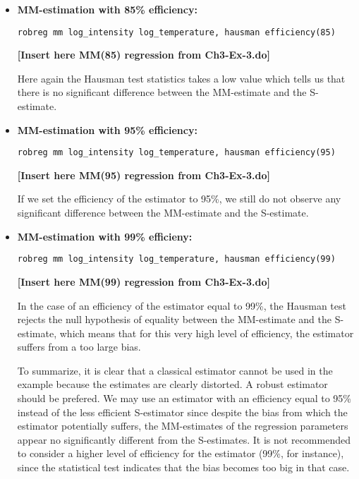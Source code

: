 \begin{stexample}
\begin{itemize}
\item \textbf{MM-estimation with 85\% efficiency:}%

\texttt{robreg mm log\_intensity log\_temperature, hausman efficiency(85)}%


\textbf{[Insert here MM(85) regression from Ch3-Ex-3.do]} 

Here again the Hausman test statistics takes a low value which tells us that
there is no significant difference between the MM-estimate and the S-estimate.

\item \textbf{MM-estimation with 95\% efficiency:}%

\texttt{robreg mm log\_intensity log\_temperature, hausman efficiency(95)}%


\textbf{[Insert here MM(95) regression from Ch3-Ex-3.do]} 

If we set the efficiency of the  estimator to 95\%, we still do not observe
any significant difference between the MM-estimate and the S-estimate.

\item \textbf{MM-estimation with 99\% efficieny:}%

\texttt{robreg mm log\_intensity log\_temperature, hausman efficiency(99)}%


\textbf{[Insert here MM(99) regression from Ch3-Ex-3.do]} 

In the case of an efficiency of the  estimator equal to 99\%, the Hausman
test rejects the null hypothesis of equality between the MM-estimate and the
S-estimate, which means that for this very high level of efficiency, the
 estimator suffers from a too large bias.

To summarize, it is clear that a classical estimator cannot be used in the
example because the  estimates are clearly distorted. A robust estimator
should be prefered. We may use an  estimator with an efficiency equal to
95\% instead of the less efficient S-estimator since despite the bias from
which the  estimator potentially suffers, the MM-estimates of the regression
parameters appear no significantly different from the S-estimates. It is not
recommended to consider a higher level of efficiency for the  estimator
(99\%, for instance), since the statistical test indicates that the bias
becomes too big in that case.
\end{itemize}
\end{stexample}

